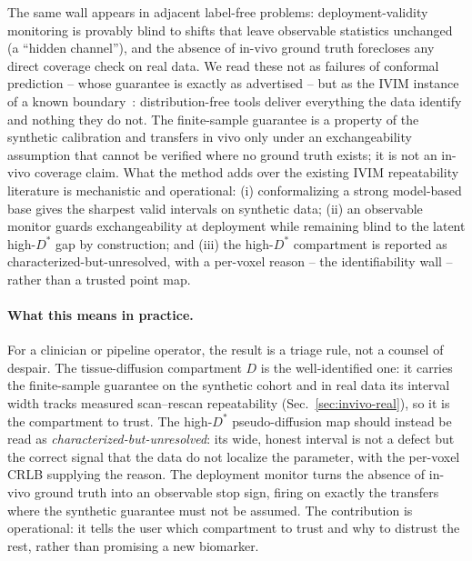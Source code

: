 \documentclass[11pt]{article}
\newcommand{\Dstar}{D^{*}}
\begin{document}
The same wall appears in adjacent label-free problems: deployment-validity monitoring
is provably blind to shifts that leave observable statistics unchanged (a ``hidden
channel''), and the absence of in-vivo ground truth forecloses any direct coverage
check on real data. We read these not as failures of conformal prediction -- whose
guarantee is exactly as advertised -- but as the IVIM instance of a known
boundary~\citep{barber2021limits}: distribution-free tools deliver everything the data
identify and nothing they do not. The finite-sample guarantee is a property of the
synthetic calibration and transfers in vivo only under an exchangeability assumption
that cannot be verified where no ground truth exists; it is not an in-vivo coverage
claim. What the method adds over the existing IVIM repeatability literature is
mechanistic and operational: (i) conformalizing a strong model-based base gives the
sharpest valid intervals on synthetic data; (ii) an observable monitor guards
exchangeability at deployment while remaining blind to the latent high-$\Dstar$ gap by
construction; and (iii) the high-$\Dstar$ compartment is reported as
characterized-but-unresolved, with a per-voxel reason -- the identifiability wall --
rather than a trusted point map.

\paragraph{What this means in practice.}
For a clinician or pipeline operator, the result is a triage rule, not a counsel of
despair. The tissue-diffusion compartment $D$ is the well-identified one: it carries
the finite-sample guarantee on the synthetic cohort and in real data its interval
width tracks measured scan--rescan repeatability (Sec.~\ref{sec:invivo-real}), so it
is the compartment to trust. The high-$\Dstar$ pseudo-diffusion map should instead be
read as \emph{characterized-but-unresolved}: its wide, honest interval is not a defect
but the correct signal that the data do not localize the parameter, with the per-voxel
CRLB supplying the reason. The deployment monitor turns the absence of in-vivo ground
truth into an observable stop sign, firing on exactly the transfers where the
synthetic guarantee must not be assumed. The contribution is operational: it tells the
user which compartment to trust and why to distrust the rest, rather than promising a
new biomarker.
\end{document}

